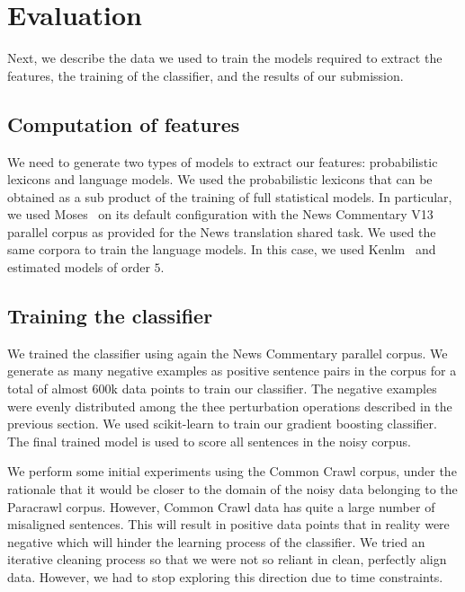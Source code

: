 \section{Evaluation}
\label{sec:results}

Next, we describe the data we used to train the models required to extract the features, the training of the classifier, and the results of our submission.

\subsection{Computation of features}

We need to generate two types of models to extract our features: probabilistic lexicons and language models. We used the probabilistic lexicons that can be obtained as a sub product of the training of full statistical models. In particular, we used Moses~\cite{Moses} on its default configuration with the News Commentary V13 parallel corpus as provided for the News translation shared task. We used the same corpora to train the language models. In this case, we used Kenlm~\cite{Kenlm} and estimated models of order $5$.


\subsection{Training the classifier}

We trained the classifier using again the News Commentary parallel corpus. We generate as many negative examples as positive sentence pairs in the corpus for a total of almost $600$k data points to train our classifier. The negative examples were evenly distributed among the thee perturbation operations described in the previous section. We used scikit-learn to train our gradient boosting classifier. The final trained model is used to score all sentences in the noisy corpus.

We perform some initial experiments using the Common Crawl corpus, under the rationale that it would be closer to the domain of the noisy data belonging to the Paracrawl corpus. However, Common Crawl data has quite a large number of misaligned sentences. This will result in positive data points that in reality were negative which will hinder the learning process of the classifier. We tried an iterative cleaning process so that we were not so reliant in clean, perfectly align data. However, we had to stop exploring this direction due to time constraints.


